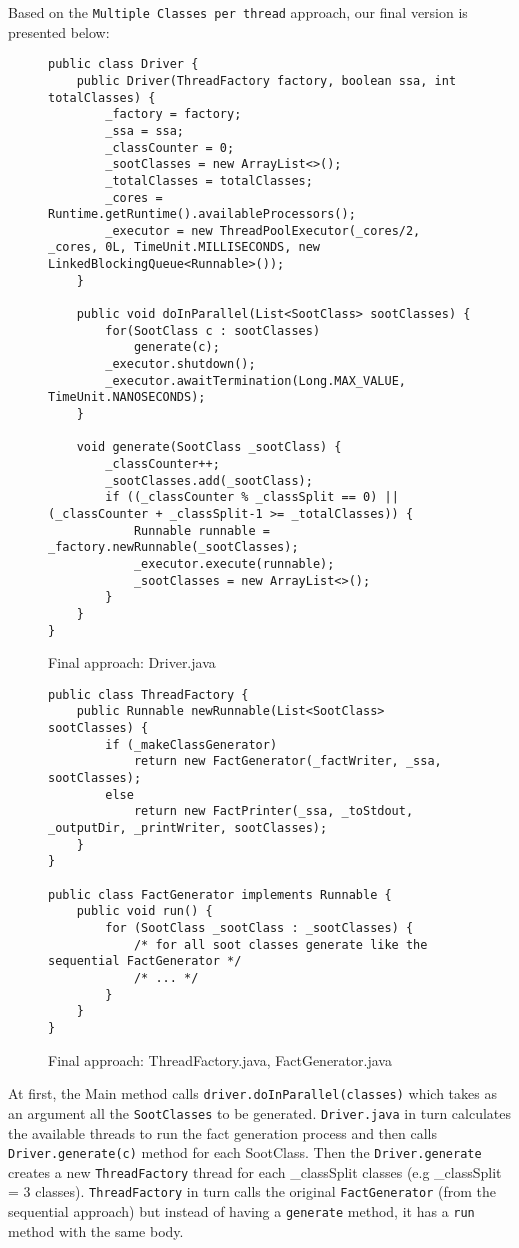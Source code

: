 \documentclass{dithesis}
\begin{document}
        Based on the \texttt{Multiple Classes per thread} approach, our final version is presented below:
                \begin{figure}[H]
\begin{lstlisting}
public class Driver {
    public Driver(ThreadFactory factory, boolean ssa, int totalClasses) {
        _factory = factory;
        _ssa = ssa;
        _classCounter = 0;
        _sootClasses = new ArrayList<>();
        _totalClasses = totalClasses;
        _cores = Runtime.getRuntime().availableProcessors();
        _executor = new ThreadPoolExecutor(_cores/2, _cores, 0L, TimeUnit.MILLISECONDS, new LinkedBlockingQueue<Runnable>());
    }

    public void doInParallel(List<SootClass> sootClasses) {
        for(SootClass c : sootClasses)
            generate(c);
        _executor.shutdown();
        _executor.awaitTermination(Long.MAX_VALUE, TimeUnit.NANOSECONDS);
    }

    void generate(SootClass _sootClass) {
        _classCounter++;
        _sootClasses.add(_sootClass);
        if ((_classCounter % _classSplit == 0) || (_classCounter + _classSplit-1 >= _totalClasses)) {
            Runnable runnable = _factory.newRunnable(_sootClasses);
            _executor.execute(runnable);
            _sootClasses = new ArrayList<>();
        }
    }
}
\end{lstlisting}
        \caption{Final approach: Driver.java}
        \end{figure}

        \begin{figure}[H]
\begin{lstlisting}
public class ThreadFactory {
    public Runnable newRunnable(List<SootClass> sootClasses) {
        if (_makeClassGenerator)
            return new FactGenerator(_factWriter, _ssa, sootClasses);
        else
            return new FactPrinter(_ssa, _toStdout, _outputDir, _printWriter, sootClasses);
    }
}

public class FactGenerator implements Runnable {
    public void run() {
        for (SootClass _sootClass : _sootClasses) {
            /* for all soot classes generate like the sequential FactGenerator */
            /* ... */
        }
    }
}
\end{lstlisting}
        \caption{Final approach: ThreadFactory.java, FactGenerator.java}
        \end{figure}
        At first, the Main method calls \texttt{driver.doInParallel(classes)} which takes as an argument all the \texttt{SootClasses} to be generated. \texttt{Driver.java} in turn calculates the available threads to run the fact generation process and then calls \texttt{Driver.generate(c)} method for each SootClass. Then the \texttt{Driver.generate} creates a new \texttt{ThreadFactory} thread for each \_classSplit classes (e.g \_classSplit = 3 classes). \texttt{ThreadFactory} in turn calls the original \texttt{FactGenerator} (from the sequential approach) but instead of having a \texttt{generate} method, it has a \texttt{run} method with the same body.
\end{document}
